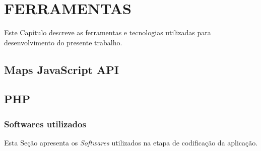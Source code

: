 
\chapter{FERRAMENTAS}
Este Capítulo descreve as ferramentas e tecnologias utilizadas para desenvolvimento do presente trabalho.

\section{Maps JavaScript API}

\section{PHP}

\subsection{Softwares utilizados}

Esta Seção apresenta os \textit{Softwares} utilizados na etapa de codificação da aplicação.

